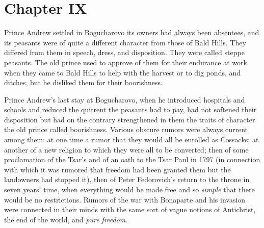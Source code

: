 
\chapter*{Chapter IX} \ifaudio {}
\fi

 Prince Andrew settled in Bogucharovo its owners had always
been absentees, and its peasants were of quite a different
character from those of Bald Hills. They differed from them in
speech, dress, and disposition. They were called steppe
peasants. The old prince used to approve of them for their
endurance at work when they came to Bald Hills to help with the
harvest or to dig ponds, and ditches, but he disliked them for
their boorishness.

Prince Andrew's last stay at Bogucharovo, when he introduced
hospitals and schools and reduced the quitrent the peasants had
to pay, had not softened their disposition but had on the
contrary strengthened in them the traits of character the old
prince called boorishness. Various obscure rumors were always
current among them: at one time a rumor that they would all be
enrolled as Cossacks; at another of a new religion to which they
were all to be converted; then of some proclamation of the Tsar's
and of an oath to the Tsar Paul in 1797 (in connection with which
it was rumored that freedom had been granted them but the
landowners had stopped it), then of Peter Fedorovich's return to
the throne in seven years' time, when everything would be made
free and so \emph{simple} that there would be no
restrictions. Rumors of the war with Bonaparte and his invasion
were connected in their minds with the same sort of vague notions
of Antichrist, the end of the world, and \emph{pure freedom}.

